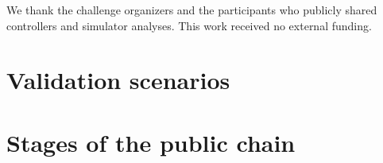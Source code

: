 \documentclass{article}
\begin{document}
\begin{ack}
We thank the challenge organizers and the participants who publicly shared controllers and simulator analyses. This work received no external funding.
\end{ack}




\clearpage
\appendix
\section{Validation scenarios}
\label{app:val16}
\begin{table}[!h]
  \caption{val16: generated buildings (seeds 601, 602, 604 to 609; seeds 600 and 603 fail the generator's minimum-zone check after rescaling) and their weather strips.}
  \centering
  \small
  
\end{table}

\section{Stages of the public chain}
\begin{table}[!h]
  \caption{Cumulative stages of the public controller chain on 10-day val16 episodes, corrected simulator, paired against the full chain; scores in $10^{-3}$.}
  \label{tab:chain}
  \centering
  \small
  
\end{table}
\end{document}

